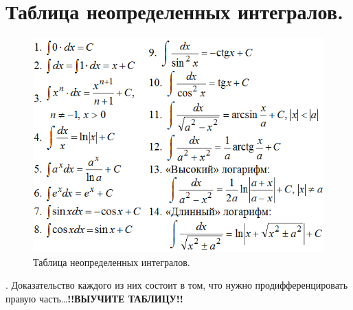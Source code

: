\documentclass{article}
\begin{document}
\section{Таблица неопределенных интегралов.}
\begin{figure}[!ht]
    \begin{center}
    \includegraphics[scale=0.6]{unkn_inttbl.png}\caption{Таблица неопределенных интегралов.}\label{Таблица неопределенных интегралов.}
    \end{center}
\end{figure}
.\newline
Доказательство каждого из них состоит в том, что нужно продифференцировать правую часть\dots \textbf{!!ВЫУЧИТЕ ТАБЛИЦУ!!}
\end{document}
